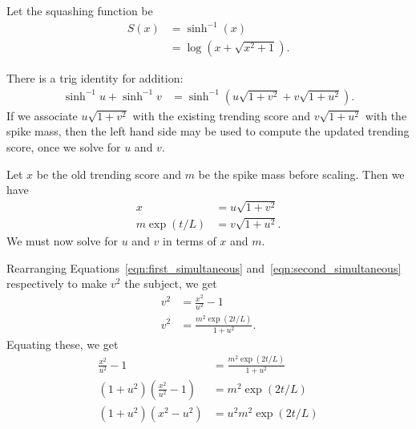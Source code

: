 \documentclass[a4paper, 12pt]{article}
\title{}
\author{Brendon J. Brewer}
\date{}
\newcommand{\asin}{\sinh^{-1}}
\begin{document}
\maketitle


\setlength{\parindent}{0pt}
\setlength{\parskip}{8pt}

Let the squashing function be
\begin{align}
S(x)
    &= \asin(x) \\
    &= \log\left(x + \sqrt{x^2 + 1}\right).    
\end{align}

There is a trig identity for addition:
\begin{align}
\asin u + \asin v &= \asin\left(u\sqrt{1+v^2} + v\sqrt{1+u^2}\right).
\end{align}
If we associate $u\sqrt{1+v^2}$ with the existing trending score
and $v\sqrt{1+u^2}$ with the spike mass, then the left hand side may be used
to compute the updated trending score, once we solve for $u$ and $v$.

Let $x$ be the old trending score and $m$ be the spike mass before scaling.
Then we have
\begin{align}
x &= u\sqrt{1+v^2} \label{eqn:first_simultaneous}\\
m\exp(t/L) &= v\sqrt{1+u^2} \label{eqn:second_simultaneous}.
\end{align}
We must now solve for $u$ and $v$ in terms of $x$ and $m$.

Rearranging Equations~\ref{eqn:first_simultaneous}
and~\ref{eqn:second_simultaneous} respectively to make $v^2$ the subject,
we get
\begin{align}
v^2 &= \frac{x^2}{u^2} - 1 \\
v^2 &= \frac{m^2\exp(2t/L)}{1 + u^2}.
\end{align}
Equating these, we get
\begin{align}
\frac{x^2}{u^2} - 1 &= \frac{m^2\exp(2t/L)}{1 + u^2} \\
\left(1 + u^2\right)\left(\frac{x^2}{u^2} - 1\right)
    &= m^2\exp(2t/L) \\
\left(1 + u^2\right)\left(x^2 - u^2\right)
    &= u^2m^2\exp(2t/L) \\
\end{align}
\end{document}
